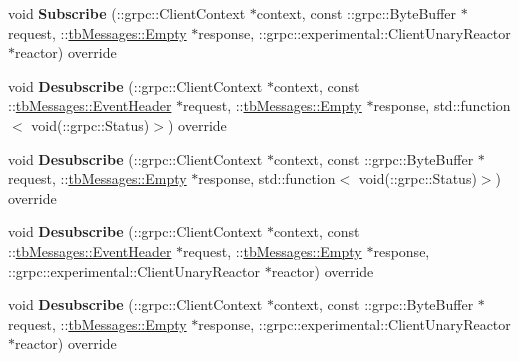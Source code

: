 \begin{DoxyCompactItemize}
\mbox{\label{classtbMessages_1_1TarboraMessages_1_1Stub_1_1experimental__async_ae41e1f79cd823d42c5591036a80d1247}} 
void {\bfseries Subscribe} (\+::grpc\+::\+Client\+Context $\ast$context, const \+::grpc\+::\+Byte\+Buffer $\ast$request, \+::\hyperlink{classtbMessages_1_1Empty}{tb\+Messages\+::\+Empty} $\ast$response, \+::grpc\+::experimental\+::\+Client\+Unary\+Reactor $\ast$reactor) override
\item 
\mbox{\label{classtbMessages_1_1TarboraMessages_1_1Stub_1_1experimental__async_a4d00a594930ea8597b99315a46b1d434}} 
void {\bfseries Desubscribe} (\+::grpc\+::\+Client\+Context $\ast$context, const \+::\hyperlink{classtbMessages_1_1EventHeader}{tb\+Messages\+::\+Event\+Header} $\ast$request, \+::\hyperlink{classtbMessages_1_1Empty}{tb\+Messages\+::\+Empty} $\ast$response, std\+::function$<$ void(\+::grpc\+::\+Status)$>$) override
\item 
\mbox{\label{classtbMessages_1_1TarboraMessages_1_1Stub_1_1experimental__async_afd42a0d76f2b5bff9fccc0b5799d0504}} 
void {\bfseries Desubscribe} (\+::grpc\+::\+Client\+Context $\ast$context, const \+::grpc\+::\+Byte\+Buffer $\ast$request, \+::\hyperlink{classtbMessages_1_1Empty}{tb\+Messages\+::\+Empty} $\ast$response, std\+::function$<$ void(\+::grpc\+::\+Status)$>$) override
\item 
\mbox{\label{classtbMessages_1_1TarboraMessages_1_1Stub_1_1experimental__async_a983db69de401f2316520c21b8cc48879}} 
void {\bfseries Desubscribe} (\+::grpc\+::\+Client\+Context $\ast$context, const \+::\hyperlink{classtbMessages_1_1EventHeader}{tb\+Messages\+::\+Event\+Header} $\ast$request, \+::\hyperlink{classtbMessages_1_1Empty}{tb\+Messages\+::\+Empty} $\ast$response, \+::grpc\+::experimental\+::\+Client\+Unary\+Reactor $\ast$reactor) override
\item 
\mbox{\label{classtbMessages_1_1TarboraMessages_1_1Stub_1_1experimental__async_abe3f2922b9fc1ace6011342ae4d57dbd}} 
void {\bfseries Desubscribe} (\+::grpc\+::\+Client\+Context $\ast$context, const \+::grpc\+::\+Byte\+Buffer $\ast$request, \+::\hyperlink{classtbMessages_1_1Empty}{tb\+Messages\+::\+Empty} $\ast$response, \+::grpc\+::experimental\+::\+Client\+Unary\+Reactor $\ast$reactor) override
\end{DoxyCompactItemize}
